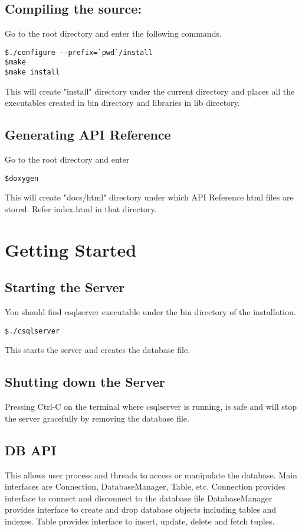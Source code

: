 \documentclass[12pt]{article}
\begin{document}
\subsection{Compiling the source:}
\label{compsrc}
Go to the root directory and enter the following commands. 
\begin{verbatim}
$./configure --prefix=`pwd`/install
$make
$make install
\end{verbatim}

This will create "install" directory under the current directory and places all the executables created in bin directory and libraries in lib directory. \\

\subsection{Generating API Reference}
\label{genAPIref}
Go to the root directory and enter
\begin{verbatim}
$doxygen
\end{verbatim}

This will create "docs/html" directory under which API Reference html files are stored. Refer index.html in that directory.

\section{Getting Started}
\label{getstarted}
\subsection{Starting the Server}
\label{startserver}
You should find csqlserver executable under the bin directory of the installation.
\begin{verbatim}
$./csqlserver
\end{verbatim}

This starts the server and creates the database file.

\subsection{Shutting down the Server}
\label{shutserver}
Pressing Ctrl-C on the terminal where csqlserver is running, is safe and will stop the server gracefully by removing the database file.

\subsection{DB API}
\label{dbapi}
This allows user process and threads to access or manipulate the database. Main interfaces are Connection, DatabaseManager, Table, etc.
Connection provides interface to connect and disconnect to the database file
DatabaseManager provides interface to create and drop database objects including tables and indexes.
Table provides interface to insert, update, delete and fetch tuples.
\end{document}
